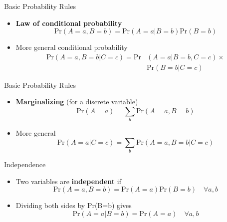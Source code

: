 \documentclass[10pt]{beamer}
\begin{document}
\begin{frame}{Basic Probability Rules}

  \begin{itemize}
  \item
\textbf{Law of conditional probability}
\begin{equation}
\mbox{Pr}(A=a,B=b)=\mbox{Pr}(A=a|B=b)\mbox{Pr}(B=b)
\end{equation}

\item More general conditional probability
\begin{align}
\mbox{Pr}(A=a,B=b|C=c)=\mbox{Pr}&(A=a|B=b,C=c)\times\nonumber\\
&\mbox{Pr}(B=b|C=c)
\end{align}
  \end{itemize}

\end{frame}
\begin{frame}{Basic Probability Rules}
  \begin{itemize}
  \item
  \textbf{Marginalizing} (for a discrete variable)
\begin{equation}
\mbox{Pr}(A=a)=\sum_{b}\mbox{Pr}(A=a,B=b)
\end{equation}

\item More general
\begin{equation}
\mbox{Pr}(A=a|C=c)=\sum_{b}\mbox{Pr}(A=a,B=b|C=c)
\end{equation}
  \end{itemize}

\end{frame}
\begin{frame}{Independence}
  \begin{itemize}
  \item
Two variables are {\bf independent} if
\begin{equation}
\mbox{Pr}(A=a,B=b)=\mbox{Pr}(A=a)\mbox{Pr}(B=b)\quad\forall a,b
\end{equation}

\item Dividing both sides by \mbox{Pr}(B=b) gives
\begin{equation}
\mbox{Pr}(A=a|B=b)=\mbox{Pr}(A=a)\quad\forall a,b
\end{equation}
  \end{itemize}
\end{frame}
\end{document}
